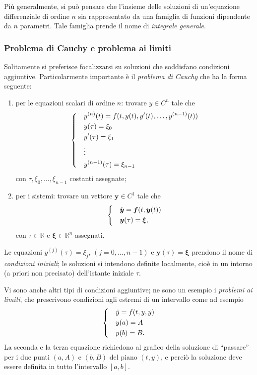\documentclass[a4paper]{book}
\numberwithin{equation}{section}
\theoremstyle{plain}
\theoremstyle{definition}
\theoremstyle{remark}
\renewcommand{\vec}{\boldsymbol}
\theoremstyle{example}
\begin{document}
	Più generalmente, si può pensare che l'insieme delle soluzioni di un'equazione differenziale di ordine $n$ sia rappresentato da una famiglia di funzioni dipendente da $n$ parametri. Tale famiglia prende il nome di \emph{integrale generale}.

	\subsubsection*{Problema di Cauchy e problema ai limiti}

	Solitamente si preferisce focalizzarsi su soluzioni che soddisfano condizioni aggiuntive. Particolarmente importante è il \emph{problema di Cauchy} che ha la forma seguente:
		\begin{enumerate}
			\item per le equazioni scalari di ordine $n$: trovare $y \in C^n$ tale che
				\begin{equation*}
					\begin{dcases}
						&y^{(n)}(t) = f(t, y(t), y'(t), \dots, y^{(n-1)}(t)) \\
						&y(\tau) = \xi_0 \\
						&y'(\tau) = \xi_1 \\
						&\vdots \\
						&y^{(n-1)}(\tau) = \xi_{n-1}
					\end{dcases}
				\end{equation*}
				con $\tau, \xi_0, \dots, \xi_{n-1}$ costanti assegnate;
				\item per i sistemi: trovare un vettore $\vec{y} \in C^1$ tale che
				 	\begin{equation*}
						\begin{dcases}
							&\dot{\vec{y}} = \vec{f}(t, \vec{y}(t)) \\
							&\vec{y}(\tau) = \vec{\xi},
						\end{dcases}
					\end{equation*}
					con $\tau \in \mathbb{R}$ e $\vec{\xi} \in \mathbb{R}^n$ assegnati.
		\end{enumerate}

Le equazioni $y^{(j)}(\tau) = \xi_j$, $(j = 0, \dots, n-1)$ e $\vec{y}(\tau) = \vec{\xi}$ prendono il nome di \emph{condizioni iniziali}; le soluzioni si intendono definite localmente, cioè in un intorno (a priori non precisato) dell'istante iniziale $\tau$.

Vi sono anche altri tipi di condizioni aggiuntive; ne sono un esempio i \emph{problemi ai limiti}, che prescrivono condizioni agli estremi di un intervallo come ad esempio
	\begin{equation*}
		\begin{dcases}
			&\ddot{y} = f(t, y, \dot{y}) \\
			&y(a) = A \\
			&y(b) = B.
		\end{dcases}
	\end{equation*}
La seconda e la terza equazione richiedono al grafico della soluzione di ``passare'' per i due punti $(a, A)$ e $(b, B)$ del piano $(t, y)$, e perciò la soluzione deve essere definita in tutto l'intervallo $[a,b]$.
\end{document}
